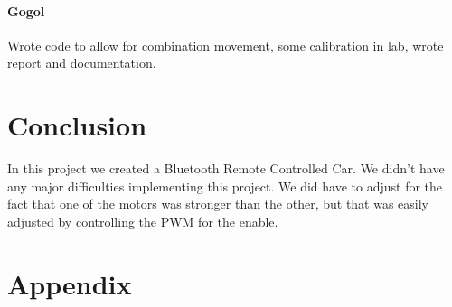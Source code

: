 \documentclass{article}
\begin{document}
	\paragraph{Gogol} Wrote code to allow for combination movement, some calibration in lab, wrote report and documentation.
	\section*{Conclusion}
	In this project we created a Bluetooth Remote Controlled Car. We didn't have any major difficulties implementing this project. We did have to adjust for the fact that one of the motors was stronger than the other, but that was easily adjusted by controlling the PWM for the enable.
	
	\pagebreak
	\section*{Appendix}
\end{document}

